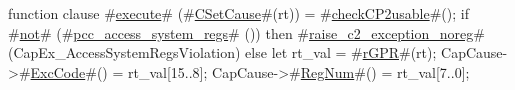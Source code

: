 function clause #\hyperref[zexecute]{execute}# (#\hyperref[zCSetCause]{CSetCause}#(rt)) = 
{
  #\hyperref[zcheckCPtwousable]{checkCP2usable}#();
  if #\hyperref[znot]{not}# (#\hyperref[zpcczyaccesszysystemzyregs]{pcc\_access\_system\_regs}# ()) then
    #\hyperref[zraisezyctwozyexceptionzynoreg]{raise\_c2\_exception\_noreg}#(CapEx_AccessSystemRegsViolation)
  else
    {
      let rt_val = #\hyperref[zrGPR]{rGPR}#(rt);
      CapCause->#\hyperref[zExcCode]{ExcCode}#() = rt_val[15..8];
      CapCause->#\hyperref[zRegNum]{RegNum}#()  = rt_val[7..0];
    }
}

